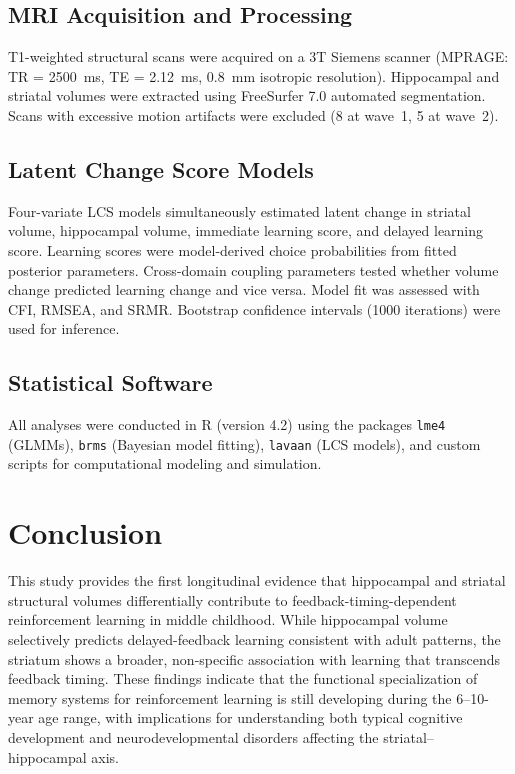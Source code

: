 \documentclass[11pt]{article}
\begin{document}
\subsection{MRI Acquisition and Processing}

T1-weighted structural scans were acquired on a 3T Siemens scanner (MPRAGE: TR = 2500~ms, TE = 2.12~ms, 0.8~mm isotropic resolution). Hippocampal and striatal volumes were extracted using FreeSurfer 7.0 automated segmentation. Scans with excessive motion artifacts were excluded (8 at wave~1, 5 at wave~2).

\subsection{Latent Change Score Models}

Four-variate LCS models \citep{mcardle2009latent} simultaneously estimated latent change in striatal volume, hippocampal volume, immediate learning score, and delayed learning score. Learning scores were model-derived choice probabilities from fitted posterior parameters. Cross-domain coupling parameters tested whether volume change predicted learning change and vice versa. Model fit was assessed with CFI, RMSEA, and SRMR. Bootstrap confidence intervals (1000 iterations) were used for inference.

\subsection{Statistical Software}

All analyses were conducted in R (version 4.2) using the packages \texttt{lme4} (GLMMs), \texttt{brms} (Bayesian model fitting), \texttt{lavaan} (LCS models), and custom scripts for computational modeling and simulation.

\section{Conclusion}

This study provides the first longitudinal evidence that hippocampal and striatal structural volumes differentially contribute to feedback-timing-dependent reinforcement learning in middle childhood. While hippocampal volume selectively predicts delayed-feedback learning consistent with adult patterns, the striatum shows a broader, non-specific association with learning that transcends feedback timing. These findings indicate that the functional specialization of memory systems for reinforcement learning is still developing during the 6--10-year age range, with implications for understanding both typical cognitive development and neurodevelopmental disorders affecting the striatal--hippocampal axis.



\end{document}
